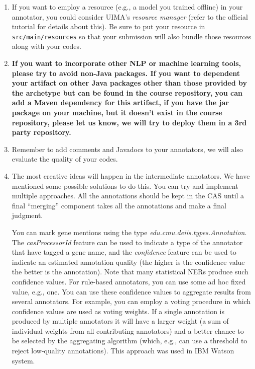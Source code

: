 \begin{enumerate}

\item If you want to employ a resource (e.g., a model you trained offline) in
your annotator, you could consider UIMA's \emph{resource manager} (refer to the
official tutorial for details about this).
Be sure to put your resource in \texttt{src/main/resources} so that your
submission will also bundle those resources along with your codes.

\item \textbf{If you want to incorporate other NLP or machine learning tools,
please try to avoid non-Java packages. If you want to dependent your artifact on
other Java packages other than those provided by the archetype but can be found
in the course repository, you can add a Maven dependency for this artifact, if
you have the jar package on your machine, but it doesn't exist in the course
repository, please let us know, we will try to deploy them in a 3rd party
repository.}

\item Remember to add comments and Javadocs to your annotators, we will also
evaluate the quality of your codes.

\item The most creative ideas will happen in the intermediate annotators. We
have mentioned some possible solutions to do this. You can try and implement
multiple approaches. All the annotations should be kept in the CAS until a final
``merging'' component takes all the annotations and make a final judgment.

You can mark gene mentions using the type \emph{edu.cmu.deiis.types.Annotation}.
The \emph{casProcessorId} feature 
can be used to indicate a type of the annotator that have tagged a gene name, 
and the \emph{confidence} feature 
can be used to indicate 
an estimated annotation quality (the higher is the confidence value the better
is the annotation).
Note that many statistical NERs produce such confidence values.
For rule-based annotators, you can use some ad hoc fixed value, e.g., one.
You can use these confidence values to aggregate results from several annotators.
For example, you can employ a voting procedure 
in which confidence values are used as voting weights.
If a single annotation is produced by multiple annotators it will have a larger weight
(a sum of individual weights from all contributing annotators)
and a better chance to be selected by the aggregating algorithm (which, e.g.,
can use a threshold to reject low-quality annotations).
This approach was used in IBM Watson system.

\end{enumerate}
